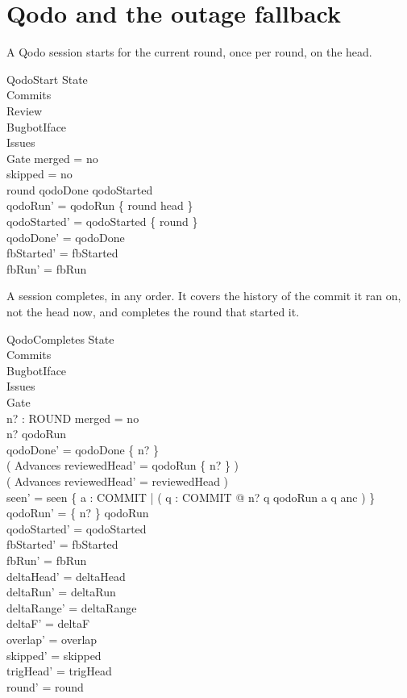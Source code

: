 \documentclass{article}
\begin{document}
\section{Qodo and the outage fallback}

A Qodo session starts for the current round, once per round, on the head.

\begin{schema}{QodoStart}
  \Delta State \\
  \Xi Commits \\
  \Xi Review \\
  \Xi BugbotIface \\
  \Xi Issues \\
  \Xi Gate
\where
  merged = no \\
  skipped = no \\
  round \notin qodoDone \cup qodoStarted \\
  qodoRun' = qodoRun \cup \{ round \mapsto head \} \\
  qodoStarted' = qodoStarted \cup \{ round \} \\
  qodoDone' = qodoDone \\
  fbStarted' = fbStarted \\
  fbRun' = fbRun
\end{schema}

A session completes, in any order. It covers the history of the commit it ran
on, not the head now, and completes the round that started it.

\begin{schema}{QodoCompletes}
  \Delta State \\
  \Xi Commits \\
  \Xi BugbotIface \\
  \Xi Issues \\
  \Xi Gate \\
  n? : ROUND
\where
  merged = no \\
  n? \in \dom qodoRun \\
  qodoDone' = qodoDone \cup \{ n? \} \\
  ( Advances \implies reviewedHead' = qodoRun \limg \{ n? \} \rimg ) \\
  ( \lnot Advances \implies reviewedHead' = reviewedHead ) \\
  seen' = seen \cup \{ a : COMMIT | ( \exists q : COMMIT @ n? \mapsto q \in qodoRun \land a \mapsto q \in anc ) \} \\
  qodoRun' = \{ n? \} \ndres qodoRun \\
  qodoStarted' = qodoStarted \\
  fbStarted' = fbStarted \\
  fbRun' = fbRun \\
  deltaHead' = deltaHead \\
  deltaRun' = deltaRun \\
  deltaRange' = deltaRange \\
  deltaF' = deltaF \\
  overlap' = overlap \\
  skipped' = skipped \\
  trigHead' = trigHead \\
  round' = round
\end{schema}
\end{document}
